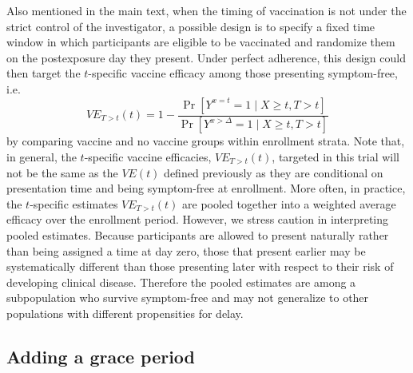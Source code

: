 \begin{appendix}
    Also mentioned in the main text, when the timing of vaccination is not under the strict control of the investigator, a possible design is to specify a fixed time window in which participants are eligible to be vaccinated and randomize them on the postexposure day they present. Under perfect adherence, this design could then target the $t$-specific vaccine efficacy among those presenting symptom-free, i.e.
    $$
    VE_{T > t}(t) = 1 - \frac{\Pr[Y^{x = t} = 1 \mid X \geq t, T > t]}{\Pr[Y^{x > \Delta} = 1 \mid X \geq t, T > t]}
    $$
    by comparing vaccine and no vaccine groups within enrollment strata. Note that, in general, the $t$-specific vaccine efficacies, $VE_{T > t}(t)$, targeted in this trial will not be the same as the $VE(t)$ defined previously as they are conditional on presentation time and being symptom-free at enrollment. More often, in practice, the $t$-specific estimates $VE_{T > t}(t)$ are pooled together into a weighted average efficacy over the enrollment period. However, we stress caution in interpreting pooled estimates. Because participants are allowed to present naturally rather than being assigned a time at day zero, those that present earlier may be systematically different than those presenting later with respect to their risk of developing clinical disease. Therefore the pooled estimates are among a subpopulation who survive symptom-free and may not generalize to other populations with different propensities for delay. 

    \subsection{Adding a grace period} \label{sec:graceperiod}


\end{appendix}
